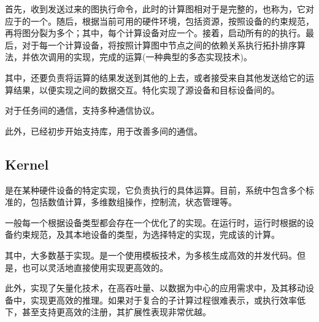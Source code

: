 \begin{content}
首先，收到发送过来的图执行命令，此时的计算图相对于是完整的，也称为，它对应于的一个。随后，根据当前可用的硬件环境，包括资源，按照设备的约束规范，再将图分裂为多个；其中，每个计算设备对应一个。接着，启动所有的的执行。最后，对于每一个计算设备，将按照计算图中节点之间的依赖关系执行拓扑排序算法，并依次调用的实现，完成的运算(一种典型的多态实现技术)。

其中，还要负责将运算的结果发送到其他的上去，或者接受来自其他发送给它的运算结果，以便实现之间的数据交互。\tf{}特化实现了源设备和目标设备间的。

\begin{enum}
\end{enum}

对于任务间的通信，\tf{}支持多种通信协议。

\begin{enum}
\end{enum}

此外，\tf{}已经初步开始支持库，用于改善多间的通信。

\subsection{Kernel}

是在某种硬件设备的特定实现，它负责执行的具体运算。目前，系统中包含多个标准的，包括数值计算，多维数组操作，控制流，状态管理等。

一般每一个根据设备类型都会存在一个优化了的实现。在运行时，运行时根据的设备约束规范，及其本地设备的类型，为选择特定的实现，完成该的计算。

其中，大多数基于实现。是一个使用模板技术，为多核生成高效的并发代码。但是，也可以灵活地直接使用实现更高效的。

此外，实现了矢量化技术，在高吞吐量、以数据为中心的应用需求中，及其移动设备中，实现更高效的推理。如果对于复合的子计算过程很难表示，或执行效率低下，甚至支持更高效的注册，其扩展性表现非常优越。

\end{content}

